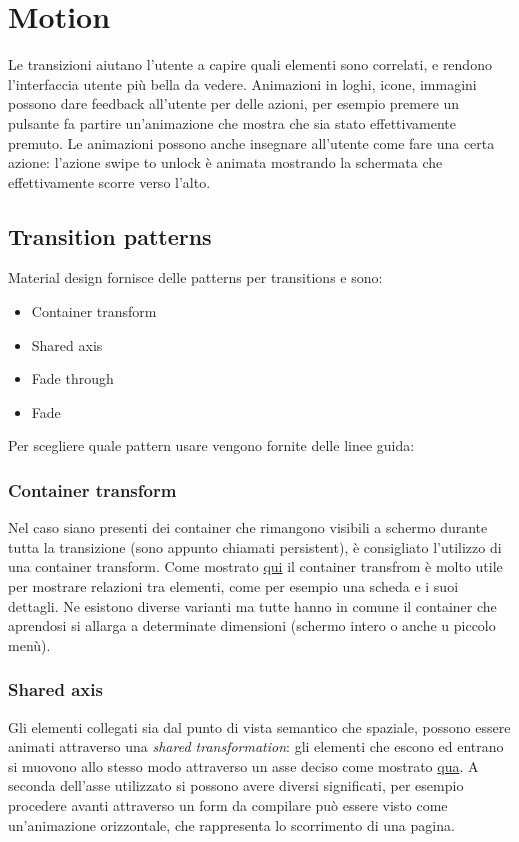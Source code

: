 \documentclass[12pt, a4paper]{report}
\begin{document}
	\section{Motion}
		Le transizioni aiutano l'utente a capire quali elementi sono correlati, e rendono l'interfaccia utente più bella da vedere.
		Animazioni in loghi, icone, immagini possono dare feedback all'utente per delle azioni, per esempio premere un pulsante fa partire un'animazione che mostra che sia stato effettivamente premuto.
		Le animazioni possono anche insegnare all'utente come fare una certa azione: l'azione swipe to unlock è animata mostrando la schermata che effettivamente scorre verso l'alto.
		\subsection{Transition patterns} 
			Material design fornisce delle patterns per transitions e sono:
			\begin{itemize}
				\item Container transform
				\item Shared axis
    			\item Fade through
				\item Fade
			\end{itemize}
		Per scegliere quale pattern usare vengono fornite delle linee guida:
		\subsubsection{Container transform}
			Nel caso siano presenti dei container che rimangono visibili a schermo durante tutta la transizione (sono appunto chiamati persistent), è consigliato l'utilizzo di una container transform.
			Come mostrato \href{https://kstatic.googleusercontent.com/files/ba0be42ae71266d6e68503fe131ff522c906a23622af8dd6cddc06f55daaf9366e9431df3645d9328b9acf84674f526c59a67d91b5ea49ef63a7404b3b95fe47}{qui}
			il container transfrom è molto utile per mostrare relazioni tra elementi, come per esempio una scheda e i suoi dettagli.
			Ne esistono diverse varianti ma tutte hanno in comune il container che aprendosi si allarga a determinate dimensioni (schermo intero o anche u piccolo menù).
		\subsubsection{Shared axis}
			Gli elementi collegati sia dal punto di vista semantico che spaziale, possono essere animati attraverso una \textit{shared transformation}: gli elementi che escono ed entrano si muovono allo stesso modo attraverso un asse deciso come mostrato \href{https://kstatic.googleusercontent.com/files/d2e9627f4006e27d36d8e839d2f3f92f1de59558bebdbe725ce5b2e0bd8a0a8c32285e10aceb52431be2e61acf003fba809ddd8bbd464ee8256bad0eee98e9a1}{qua}.
			A seconda dell'asse utilizzato si possono avere diversi significati, per esempio procedere avanti attraverso un form da compilare può essere visto come un'animazione orizzontale, che rappresenta lo scorrimento di una pagina.
\end{document}
